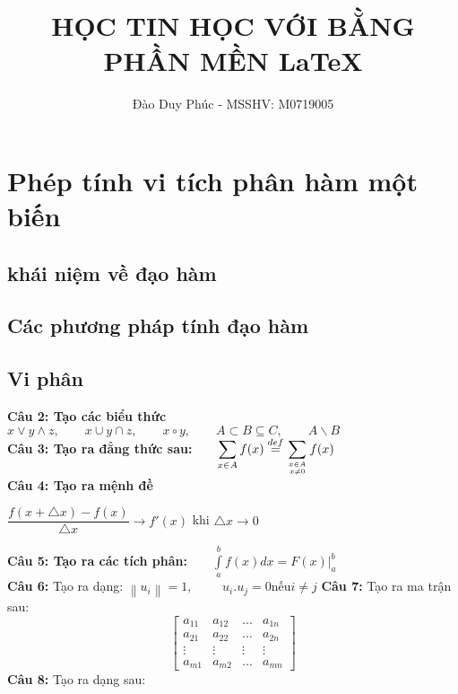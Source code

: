 \documentclass[12pt,a4paper]{book}
\author{Đào Duy Phúc - MSSHV: M0719005}
\title{HỌC TIN HỌC VỚI BẰNG PHẦN MỀN \LaTeX}
\theoremstyle{plain}%
\begin{document}
\maketitle %
\chapter[chương 1:] {Phép tính vi tích phân hàm một biến}
\section{khái niệm về đạo hàm}
\section{Các phương pháp tính đạo hàm}
\section{Vi phân}
\fontsize{17pt}{40pt}\selectfont
\textbf{Câu 2: Tạo các biểu thức}
\fontsize{17pt}{40pt}\selectfont\\
$ x\vee y\wedge z, \qquad x\cup y\cap z, \qquad x\circ y, \qquad A\subset B\subseteq C,\qquad A\backslash B $\\
\textbf{Câu 3: Tạo ra đẳng thức sau:}$\qquad\displaystyle \sum_{x\in A}f(x)\stackrel{de f}{=}\displaystyle
\sum _{x\in A\atop x\neq 0}f(x)$\\
\textbf{Câu 4: Tạo ra mệnh đề}\\
\begin{center}
$\dfrac{f(x+\bigtriangleup x)-f(x)}{\bigtriangleup x}\longrightarrow f'(x)$ \mbox{khi} $ \bigtriangleup x\rightarrow0$\\
\end{center}
\textbf{Câu 5: Tạo ra các tích phân:}$\qquad\int\limits_a^b {f(x)dx = \left. {F\left( x \right)} \right|_a^b} $\\
\textbf{Câu 6:} Tạo ra dạng: \qquad$\left\| {{u_i}} \right\| = 1,$ $\qquad{u_i}.{u_j} = 0$\qquad \mbox{nếu}\qquad $i \ne j$
\textbf{Câu 7:} Tạo ra ma trận sau:\\
\[\left[ {\begin{array}{*{20}{c}}
{{a_{11}}}&{{a_{12}}}&{...}&{{a_{1n}}}\\
{{a_{21}}}&{{a_{22}}}&{...}&{{a_{2n}}}\\
 \vdots & \vdots & \vdots & \vdots \\
{{a_{m1}}}&{{a_{m2}}}&{...}&{{a_{mn}}}
\end{array}} \right]\]
\textbf{Câu 8:} Tạo ra dạng sau:\\
\end{document}
